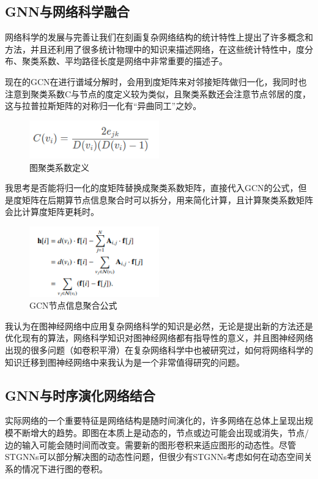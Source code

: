 \documentclass[10pt,journal,compsoc]{IEEEtran}
\begin{document}
\subsection{GNN与网络科学融合}
网络科学的发展与完善让我们在刻画复杂网络结构的统计特性上提出了许多概念和方法，并且还利用了很多统计物理中的知识来描述网络，在这些统计特性中，度分布、聚类系数、平均路径长度是网络中非常重要的描述子。

​	现在的GCN在进行谱域分解时，会用到度矩阵来对邻接矩阵做归一化，我同时也注意到聚类系数C与节点的度定义较为类似，且聚类系数还会注意节点邻居的度，这与拉普拉斯矩阵的对称归一化有“异曲同工”之妙。
\begin{figure}
	\centering
	\includegraphics[width=0.5\textwidth]{3-1}
	\caption{图聚类系数定义}
	\label{fig:图聚类系数定义}
\end{figure}

我思考是否能将归一化的度矩阵替换成聚类系数矩阵，直接代入GCN的公式，但是度矩阵在后期算节点信息聚合时可以拆分，用来简化计算，且计算聚类系数矩阵会比计算度矩阵更耗时。

\begin{figure}
	\centering
	\includegraphics[width=0.5\textwidth]{3-2}
	\caption{GCN节点信息聚合公式}
	\label{fig:GCN节点信息聚合公式}
\end{figure}

我认为在图神经网络中应用复杂网络科学的知识是必然，无论是提出新的方法还是优化现有的算法，网络科学知识对图神经网络都有指导性的意义，并且图神经网络出现的很多问题（如卷积平滑）在复杂网络科学中也被研究过，如何将网络科学的知识迁移到图神经网络中来我认为是一个非常值得研究的问题。

\subsection{GNN与时序演化网络结合}

实际网络的一个重要特征是网络结构是随时间演化的，许多网络在总体上呈现出规模不断增大的趋势。即图在本质上是动态的，节点或边可能会出现或消失，节点/边的输入可能会随时间而改变。需要新的图形卷积来适应图形的动态性。尽管STGNNs可以部分解决图的动态性问题，但很少有STGNNs考虑如何在动态空间关系的情况下进行图的卷积。
\end{document}
